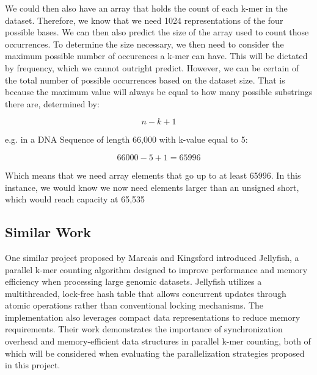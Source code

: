 \documentclass{article}
\begin{document}
\vspace{\baselineskip}

We could then also have an array that holds the count of each k-mer in the dataset. Therefore, we know that we  
need 1024 representations of the four possible bases. We can then also predict the size of the array used to count those  
occurrences. To determine the size necessary, we then need to consider the maximum possible number of occurences  
a k-mer can have. This will be dictated by frequency, which we cannot outright predict. However, we  
can be certain of the total number of possible occurrences based on the dataset size. That is because the maximum  
value will always be equal to how many possible substrings there are, determined by:

\vspace{\baselineskip}

\[
n - k + 1
\]

\vspace{\baselineskip}

e.g. in a DNA Sequence of length 66,000 with k-value equal to 5:

\vspace{\baselineskip}

\[
66000 - 5 + 1 = 65996
\]

\vspace{\baselineskip}

Which means that we need array elements that go up to at least 65996. In this instance, we would know we now need  
elements larger than an unsigned short, which would reach capacity at 65,535

\vspace{\baselineskip}

\subsection{Similar Work}

\vspace{\baselineskip}

One similar project proposed by Marcais and Kingsford \cite{marcais2011jellyfish} introduced Jellyfish, a parallel k-mer counting 
algorithm designed to improve performance and memory efficiency when processing large genomic datasets. Jellyfish utilizes a
multithreaded, lock-free hash table that allows concurrent updates through atomic operations rather than conventional
locking mechanisms. The implementation also leverages compact data representations to reduce memory requirements. Their work 
demonstrates the importance of synchronization overhead and memory-efficient data structures in parallel k-mer
counting, both of which will be considered when evaluating the parallelization strategies proposed in this project. 
\end{document}
